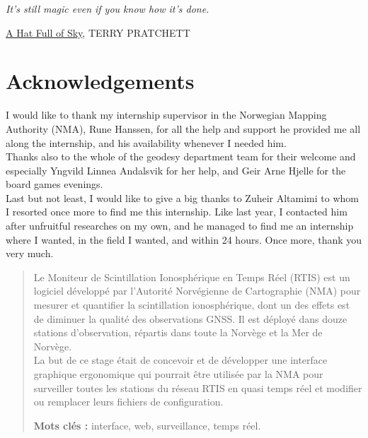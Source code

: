 \documentclass{themeensg}
\newlength\longest
\begin{document}
\clearpage

\thispagestyle{empty}
\null\vfill

\settowidth{}
\begin{center}
\parbox{\longest}{
  \raggedright{\huge\itshape
  It's still magic even if you know how it's done.\par\bigskip
  }
  \raggedleft\Large\underline{A Hat Full of Sky}\MakeUppercase{, Terry Pratchett}\par%
}
\end{center}
\vfill\vfill

\clearpage

\newevenpage
\chapter*{Acknowledgements}

I would like to thank my internship supervisor in the Norwegian Mapping Authority (NMA), Rune Hanssen, for all the help and support he provided me all along the internship, and his availability whenever I needed him.\\

Thanks also to the whole of the geodesy department team for their welcome and especially Yngvild Linnea Andalsvik for her help, and Geir Arne Hjelle for the board games evenings.\\

Last but not least, I would like to give a big thanks to Zuheir Altamimi to whom I resorted once more to find me this internship. Like last year, I contacted him after unfruitful researches on my own, and he managed to find me an internship where I wanted, in the field I wanted, and within 24 hours. Once more, thank you very much.

\begin{abstract}
\thispagestyle{empty}
	\vspace{1cm}

	Le Moniteur de Scintillation Ionosphérique en Temps Réel (RTIS) est un logiciel développé par l'Autorité  Norvégienne de Cartographie (NMA) pour mesurer et quantifier la scintillation ionosphérique, dont un des effets est de diminuer la qualité des observations GNSS. Il est déployé dans douze stations d'observation, répartis dans toute la Norvège et la Mer de Norvège. \\
	La but de ce stage était de concevoir et de développer une interface graphique ergonomique qui pourrait être utilisée par la NMA pour surveiller toutes les stations du réseau RTIS en quasi temps réel et modifier ou remplacer leurs fichiers de configuration.
	\vspace{1.5cm}
	
	\textbf{Mots clés :} interface, web, surveillance, temps réel.
\end{abstract}
\end{document}
